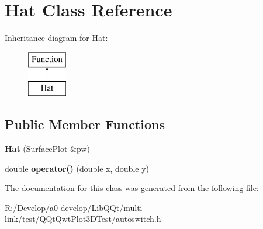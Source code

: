 \hypertarget{class_hat}{}\section{Hat Class Reference}
\label{class_hat}
Inheritance diagram for Hat\+:\begin{figure}[H]
\begin{center}
\leavevmode
\includegraphics[height=2.000000cm]{class_hat}
\end{center}
\end{figure}
\subsection*{Public Member Functions}
\begin{DoxyCompactItemize}
\item 
\mbox{\label{class_hat_a4691e690402f55490740e21728348ef3}} 
{\bfseries Hat} (Surface\+Plot \&pw)
\item 
\mbox{\label{class_hat_a376b705162dc6fabc09c05d2bbf52597}} 
double {\bfseries operator()} (double x, double y)
\end{DoxyCompactItemize}


The documentation for this class was generated from the following file\+:\begin{DoxyCompactItemize}
\item 
R\+:/\+Develop/a0-\/develop/\+Lib\+Q\+Qt/multi-\/link/test/\+Q\+Qt\+Qwt\+Plot3\+D\+Test/autoswitch.\+h\end{DoxyCompactItemize}

